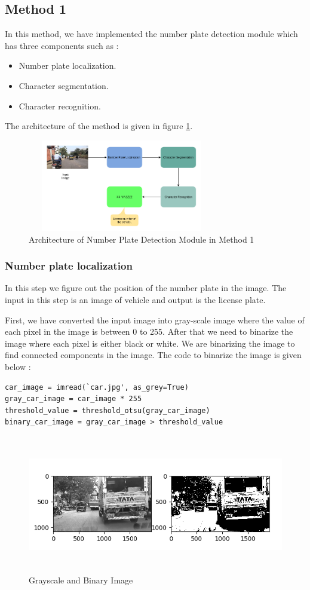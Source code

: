 \subsection{Method 1}
In this method, we have implemented the number plate detection module which has three components such as : 
\begin{itemize}
    \item Number plate localization.
    \item Character segmentation.
    \item Character recognition.
\end{itemize}
\par The architecture of the method is given in figure \ref{fig12}.
\begin{figure}[!htb]
\centerline{\includegraphics[height=40mm,width=82mm]{img/rd12.png}}
\caption{Architecture of Number Plate Detection Module in Method 1}
\label{fig12}
\end{figure}
\subsubsection{Number plate localization}
In this step we figure out the position of the number plate in the image. The input in this step is an image of vehicle and output is the license plate. 
\par First, we have converted the input image into gray-scale image where the value of each pixel in the image is between 0 to 255. After that we need to binarize the image where each pixel is either black or white. We are binarizing the image to find connected components in the image. The code to binarize the image is given below : 
\begin{lstlisting}[caption=Image binarization]
car_image = imread(`car.jpg', as_grey=True)
gray_car_image = car_image * 255
threshold_value = threshold_otsu(gray_car_image)
binary_car_image = gray_car_image > threshold_value
\end{lstlisting}
\begin{figure}[!htb]
\centerline{\includegraphics[height=60mm,width=132mm]{img/rd3.png}}
\caption{Grayscale and Binary Image}
\label{fig3}
\end{figure}


